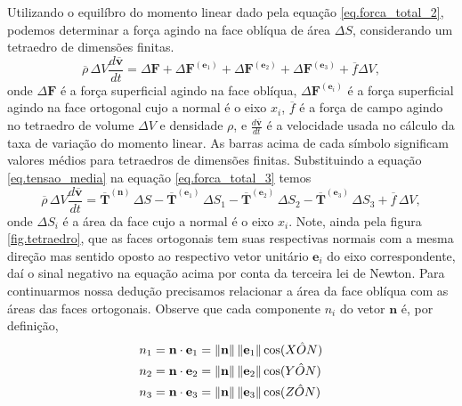 Utilizando o equil\'ibro do momento linear dado pela equa\c{c}\~ao \ref{eq.forca_total_2}, podemos determinar a for\c{c}a agindo na face obl\'iqua de \'area $\Delta S$, considerando um tetraedro de dimens\~oes finitas.
\begin{equation}\label{eq.forca_total_3}
\overline{\rho}\,\Delta V\frac{d\overline{\mathbf{v}}}{dt}=\Delta \mathbf{F}+\Delta\mathbf{F}^{(\mathbf{e}_1)}+\Delta\mathbf{F}^{(\mathbf{e}_2)}+\Delta\mathbf{F}^{(\mathbf{e}_3)}+\overline{f}\Delta V,
\end{equation} 
onde $\Delta\mathbf{F}$ \'e a for\c{c}a superficial agindo na face obl\'iqua, $\Delta\mathbf{F}^{(\mathbf{e}_i)}$ \'e a for\c{c}a superficial agindo na face ortogonal cujo a normal \'e o eixo $x_i$, $\overline{f}$ \'e a for\c{c}a de campo agindo no tetraedro de volume $\Delta V$ e densidade $\rho$, e $\frac{d\overline{\mathbf{v}}}{dt}$ \'e a velocidade usada no c\'alculo da taxa de varia\c{c}\~ao do momento linear. As barras acima de cada s\'imbolo significam valores m\'edios para tetraedros de dimens\~oes finitas. Substituindo a equa\c{c}\~ao \ref{eq.tensao_media} na equa\c{c}\~ao \ref{eq.forca_total_3} temos
\begin{equation}\label{eq.forca_total_4}
\overline{\rho}\,\Delta V\frac{d\overline{\mathbf{v}}}{dt}=\mathbf{\overline{T}}^{(\mathbf{n})}\,\Delta S-\mathbf{\overline{T}}^{(\mathbf{e}_1)}\,\Delta S_1-\mathbf{\overline{T}}^{(\mathbf{e}_2)}\,\Delta S_2-\mathbf{\overline{T}}^{(\mathbf{e}_3)}\,\Delta S_3+\overline{f}\,\Delta V,
\end{equation}
onde $\Delta S_i$ \'e a \'area da face cujo a normal \'e o eixo $x_i$. Note, ainda pela figura \ref{fig.tetraedro}, que as faces ortogonais tem suas respectivas normais com a mesma dire\c{c}\~ao mas sentido oposto ao respectivo vetor unit\'ario $\mathbf{e}_i$ do eixo correspondente, da\'i o sinal negativo na equa\c{c}\~ao acima por conta da terceira lei de Newton. Para continuarmos nossa dedução precisamos relacionar a \'area da face obl\'iqua com as \'areas das faces ortogonais. Observe que cada componente $n_i$ do vetor $\mathbf{n}$ \'e, por defini\c{c}\~ao,
\begin{align*}
n_1&=\mathbf{n}\cdot\mathbf{e}_1=\lVert\mathbf{n}\rVert\,\lVert\mathbf{e}_1\rVert\cos(X\hat{O}N)\\
n_2&=\mathbf{n}\cdot\mathbf{e}_2=\lVert\mathbf{n}\rVert\,\lVert\mathbf{e}_2\rVert\cos(Y\hat{O}N)\\
n_3&=\mathbf{n}\cdot\mathbf{e}_3=\lVert\mathbf{n}\rVert\,\lVert\mathbf{e}_3\rVert\cos(Z\hat{O}N)\\
\end{align*}
